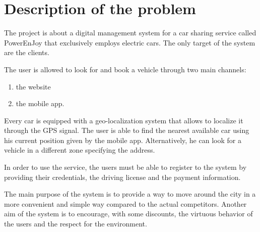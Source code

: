 \section{Description of the problem}
The project is about a digital management system for a car sharing service called PowerEnJoy that exclusively employs electric cars. The only target of the system are the clients.
 
The user is allowed to look for and book a vehicle through two main channels:
\begin{enumerate}
	\item the website
	\item the mobile app.
\end{enumerate}

Every car is equipped with a geo-localization system that allows to localize it through the GPS signal.
The user is able to find the nearest available car using his current position given by the mobile app.
Alternatively, he can look for a vehicle in a different zone specifying the address.

In order to use the service, the users must be able to register to the system by providing their credentials, the driving license and the payment information.


The main purpose of the system is to provide a way to move around the city in a more convenient and simple way compared to the actual competitors. Another aim of the system is to encourage, with some discounts, the virtuous behavior of the users and the respect for the environment.
